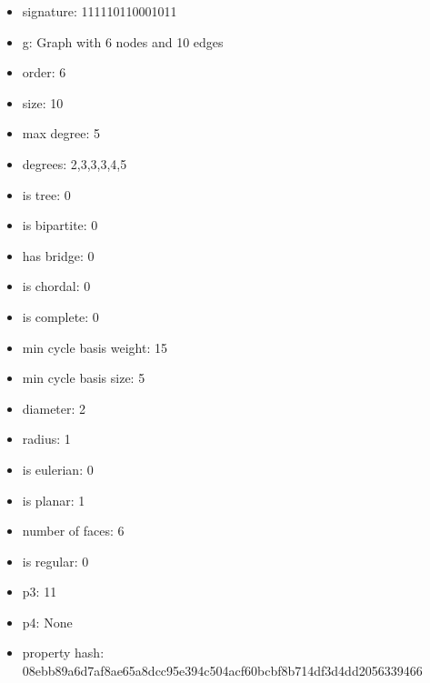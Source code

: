 \begin{itemize}
\item signature: 111110110001011
\item g: Graph with 6 nodes and 10 edges
\item order: 6
\item size: 10
\item max degree: 5
\item degrees: 2,3,3,3,4,5
\item is tree: 0
\item is bipartite: 0
\item has bridge: 0
\item is chordal: 0
\item is complete: 0
\item min cycle basis weight: 15
\item min cycle basis size: 5
\item diameter: 2
\item radius: 1
\item is eulerian: 0
\item is planar: 1
\item number of faces: 6
\item is regular: 0
\item p3: 11
\item p4: None
\item property hash: 08ebb89a6d7af8ae65a8dcc95e394c504acf60bcbf8b714df3d4dd2056339466
\end{itemize}
\newpage
